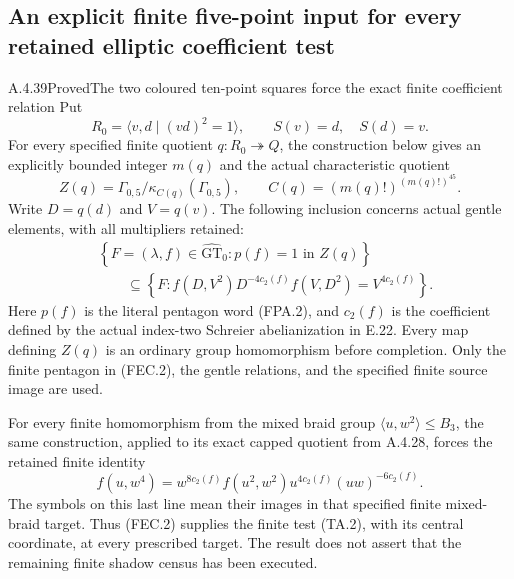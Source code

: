 \subsection{An explicit finite five-point input for every retained elliptic coefficient test}

\begin{result}{A.4.39}{Proved}{The two coloured ten-point squares force the exact finite coefficient relation}
Put
\[
 R_0=\langle v,d\mid(vd)^2=1\rangle,
 \qquad S(v)=d,\quad S(d)=v.
                                                               \tag{FEC.1}
\]
For every specified finite quotient $q:R_0\twoheadrightarrow Q$,
the construction below gives an explicitly bounded integer
$m(q)$ and the actual characteristic quotient
\[
 Z(q)=\Gamma_{0,5}/\kappa_{C(q)}(\Gamma_{0,5}),
 \qquad C(q)=(m(q)!)^{(m(q)!)^{45}}.
                                                               \tag{FEC.2}
\]
Write $D=q(d)$ and $V=q(v)$.  The following inclusion
concerns actual gentle elements, with all multipliers retained:
\[
 \begin{aligned}
 &\left\{F=(\lambda,f)\in\widehat{\mathrm{GT}}_0:
                  p(f)=1\text{ in }Z(q)\right\}\\
 &\qquad\subseteq
 \left\{F:
   f(D,V^2)D^{-4c_2(f)}f(V,D^2)=V^{4c_2(f)}\right\}.
 \end{aligned}
                                                               \tag{FEC.3}
\]
Here $p(f)$ is the literal pentagon word (FPA.2), and
$c_2(f)$ is the coefficient defined by the actual index-two
Schreier abelianization in E.22.  Every map defining $Z(q)$
is an ordinary group homomorphism before completion.  Only
the finite pentagon in (FEC.2), the gentle relations, and the
specified finite source image are used.

For every finite homomorphism from the mixed braid group
$\langle u,w^2\rangle\leq B_3$, the same construction, applied
to its exact capped quotient from A.4.28, forces the retained
finite identity
\[
 f(u,w^4)=w^{8c_2(f)}f(u^2,w^2)u^{4c_2(f)}
                         (uw)^{-6c_2(f)}.
                                                               \tag{FEC.4}
\]
The symbols on this last line mean their images in that
specified finite mixed-braid target.  Thus (FEC.2) supplies
the finite test (TA.2), with its central coordinate, at every
prescribed target.  The result does not assert that the
remaining finite shadow census has been executed.
\end{result}

